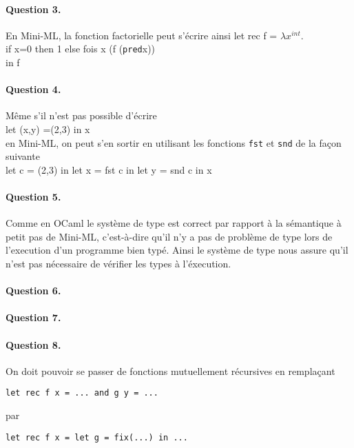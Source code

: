 \documentclass{article}
\theoremstyle{thm}
\theoremstyle{def}
\theoremstyle{dem}
\newcommand{\code}[1]{\texttt{#1}}
\begin{document}
	\paragraph{Question 3.}
	En Mini-ML, la fonction factorielle peut s'écrire ainsi
	let rec f = $\lambda x^{int}$.\\
	if x=0 then 1 else fois x (f (\code{pred}x))\\
	in f\\

	\paragraph{Question 4.}
	Même s'il n'est pas possible d'écrire\\
	let (x,y) =(2,3) in x\\
	en Mini-ML, on peut s'en sortir en utilisant les fonctions \code{fst} et \code{snd} de la façon suivante\\
	let c = (2,3) in let x = fst c in let y = snd c in x

	\paragraph{Question 5.}
	Comme en OCaml le système de type est correct par rapport à la sémantique à petit pas de Mini-ML, c'est-à-dire qu'il n'y a pas de problème de type lors de l'execution d'un programme bien typé. Ainsi le système de type nous assure qu'il n'est pas nécessaire de vérifier les types à l'éxecution.

	\paragraph{Question 6.}

	\paragraph{Question 7.}

	\paragraph{Question 8.}On doit pouvoir se passer de fonctions mutuellement récursives en remplaçant
	\begin{lstlisting}
let rec f x = ... and g y = ...
		\end{lstlisting}
	par
	\begin{lstlisting}
let rec f x = let g = fix(...) in ...
	\end{lstlisting}
\end{document}
